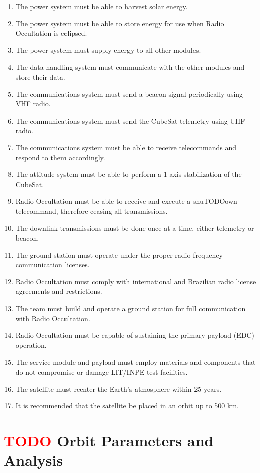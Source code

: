 \begin{enumerate}
    \item The power system must be able to harvest solar energy.
    \item The power system must be able to store energy for use when Radio Occultation is eclipsed.
    \item The power system must supply energy to all other modules.
    \item The data handling system must communicate with the other modules and store their data.
    \item The communications system must send a beacon signal periodically using VHF radio.
    \item The communications system must send the CubeSat telemetry using UHF radio.
    \item The communications system must be able to receive telecommands and respond to them accordingly.
    \item The attitude system must be able to perform a 1-axis stabilization of the CubeSat.
    \item Radio Occultation must be able to receive and execute a shuTODOown telecommand, therefore ceasing all transmissions.
    \item The downlink transmissions must be done once at a time, either telemetry or beacon.
    \item The ground station must operate under the proper radio frequency communication licenses.
    \item Radio Occultation must comply with international and Brazilian radio license agreements and restrictions.
    \item The team must build and operate a ground station for full communication with Radio Occultation.
    \item Radio Occultation must be capable of sustaining the primary payload (EDC) operation.
    \item The service module and payload must employ materials and components that do not compromise or damage LIT/INPE test facilities.
    \item The satellite must reenter the Earth's atmosphere within 25 years.
    \item It is recommended that the satellite be placed in an orbit up to 500 km.
\end{enumerate}


\section{ \textcolor{red}{TODO} Orbit Parameters and Analysis}

